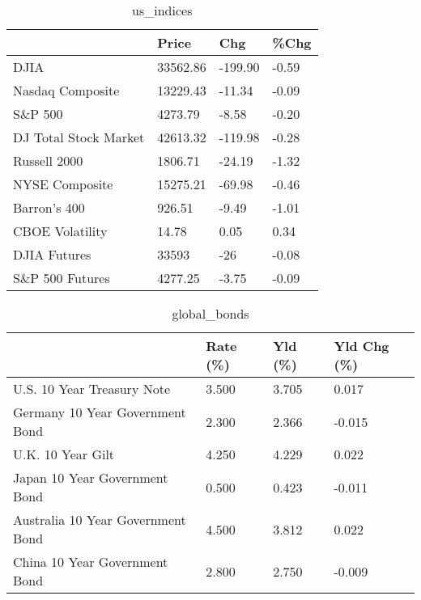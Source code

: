 \documentclass{article}%
\begin{document}
%


\begin{table}[htbp]%
\caption{us\_indices}%
\centering%
\begin{adjustbox}{width=1\textwidth}%
\begin{tabular}{llll}
\toprule
                      &    Price &     Chg &  \%Chg \\
\midrule
                 DJIA & 33562.86 & -199.90 & -0.59 \\
     Nasdaq Composite & 13229.43 &  -11.34 & -0.09 \\
              S\&P 500 &  4273.79 &   -8.58 & -0.20 \\
DJ Total Stock Market & 42613.32 & -119.98 & -0.28 \\
         Russell 2000 &  1806.71 &  -24.19 & -1.32 \\
       NYSE Composite & 15275.21 &  -69.98 & -0.46 \\
         Barron's 400 &   926.51 &   -9.49 & -1.01 \\
      CBOE Volatility &    14.78 &    0.05 &  0.34 \\
         DJIA Futures &    33593 &     -26 & -0.08 \\
      S\&P 500 Futures &  4277.25 &   -3.75 & -0.09 \\
\bottomrule
\end{tabular}
%
\end{adjustbox}%
\end{table}

%


\begin{table}[htbp]%
\caption{global\_bonds}%
\centering%
\begin{adjustbox}{width=1\textwidth}%
\begin{tabular}{llll}
\toprule
                                  & Rate (\%) & Yld (\%) & Yld Chg (\%) \\
\midrule
       U.S. 10 Year Treasury Note &    3.500 &   3.705 &       0.017 \\
  Germany 10 Year Government Bond &    2.300 &   2.366 &      -0.015 \\
                U.K. 10 Year Gilt &    4.250 &   4.229 &       0.022 \\
    Japan 10 Year Government Bond &    0.500 &   0.423 &      -0.011 \\
Australia 10 Year Government Bond &    4.500 &   3.812 &       0.022 \\
    China 10 Year Government Bond &    2.800 &   2.750 &      -0.009 \\
\bottomrule
\end{tabular}
%
\end{adjustbox}%
\end{table}
\end{document}

